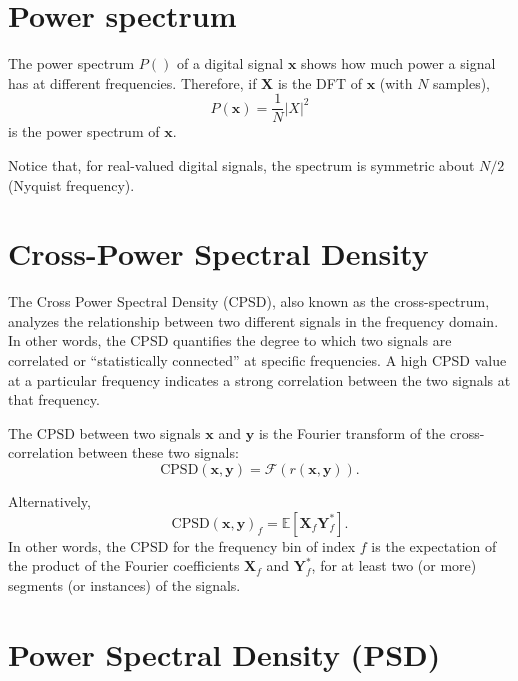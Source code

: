 \documentclass{article}
\begin{document}

\section{Power spectrum}

The power spectrum $P()$ of a digital signal $\mathbf{x}$ shows how
much power a signal has at different frequencies. Therefore, if
$\mathbf{X}$ is the DFT of $\mathbf{x}$ (with $N$ samples),
\begin{equation}
  P(\mathbf{x}) = \frac{1}{N}|X|^2
\end{equation}
is the power spectrum of $\mathbf{x}$.

Notice that, for real-valued digital signals, the spectrum is
symmetric about $N/2$ (Nyquist frequency).


\section{Cross-Power Spectral Density}
The Cross Power Spectral Density (CPSD), also known as the
cross-spectrum, analyzes the relationship between two different
signals in the frequency domain. In other words, the CPSD quantifies
the degree to which two signals are correlated or ``statistically
connected'' at specific frequencies. A high CPSD value at a particular
frequency indicates a strong correlation between the two signals at
that frequency.

The $\text{CPSD}$ between two signals $\mathbf{x}$ and $\mathbf{y}$ is
the Fourier transform of the cross-correlation between these two
signals:
\begin{equation}
  \text{CPSD}(\mathbf{x},\mathbf{y})=\mathcal{F}({r(\mathbf{x},\mathbf{y})}).
\end{equation}

Alternatively,
\begin{equation}
  \text{CPSD}(\mathbf{x},\mathbf{y})_f=\mathbb{E}[\mathbf{X}_f\mathbf{Y}_f^*].
\end{equation}
In other words, the CPSD for the frequency bin of index $f$ is the
expectation of the product of the Fourier coefficients $\mathbf{X}_f$
and $\mathbf{Y}_f^*$, for at least two (or more) segments (or
instances) of the signals.

\section{Power Spectral Density (PSD)}
\end{document}
